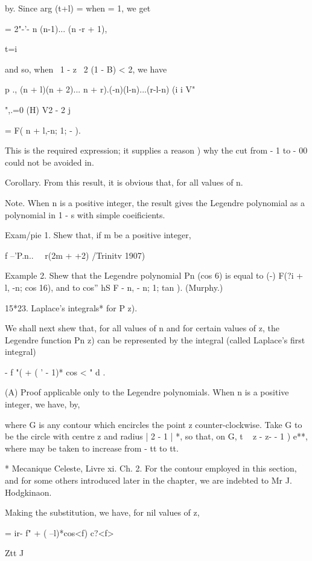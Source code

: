 {{by. Since arg (t+l) = when = 1, we get

= 2"-'- n (n-1)... (n -r + 1),

t=i

and so, when \ 1 - z \ 2 (1 - B) < 2, we have

p ., (n + l)(n + 2)... n + r).(-n)(l-n)...(r-l-n) (i i V"

   ",.=0 (H) V2 - 2 j

= F( n + l,-n; 1; - ).

This is the required expression; it supplies a reason ) why
the cut from - 1 to - 00 could not be avoided in.

Corollary. From this result, it is obvious that, for all values of n.

Note. When n is a positive integer, the result gives the Legendre
polynomial as a polynomial in 1 - s with simple coeificients.

Exam/pie 1. Shew that, if m be a positive integer,

f --'P.n.. \ \ r(2m + +2) /Trinitv 1907)

Example 2. Shew that the Legendre polynomial Pn (cos 6) is equal to
(-) F(?i + l, -n; \; cos 16), and to cos'' hS F - n, - n; 1; tan ).
(Murphy.)

15*23. Laplace's integrals* for P z).

We shall next shew that, for all values of n and for certain values of
z, the Legendre function Pn z) can be represented by the integral
(called Laplace's first integral)

- f "( + ( ' - 1)* cos < " d .

(A) Proof applicable only to the Legendre polynomials. When n is a
positive integer, we have, by,

where G is any contour which encircles the point z counter-clockwise.
Take G to be the circle with centre z and radius | 2 - 1 | *, so that,
on G, t ~ z - z- - 1 ) e**, where may be taken to increase from - tt
to tt.

* Mecanique Celeste, Livre xi. Ch. 2. For the contour employed in this
section, and for some others introduced later in the chapter, we are
indebted to Mr J. Hodgkinaon.

%
%

Making the substitution, we have, for nil values of z,

= ir- f" + ( --l)*cos<f) c?<f>

Ztt J \

}}
